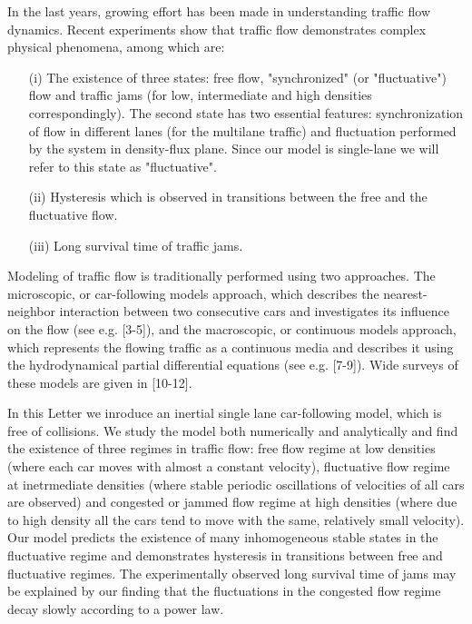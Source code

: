 \pacs{}


In the last years, growing effort has been made in understanding 
traffic flow dynamics. Recent experiments \cite{KR1,KR2} show that
traffic flow demonstrates complex physical phenomena, among which 
are: 
\begin{itemize}
\item[(i)] The existence of three states: free flow, "synchronized" (or
"fluctuative") flow and traffic jams (for low, intermediate and high
densities correspondingly). 
The second state has two essential features: synchronization of flow in
different lanes (for the multilane traffic) and fluctuation performed by the 
system in density-flux plane. Since our model is single-lane we will refer to
this state as "fluctuative".  
\item[(ii)] Hysteresis which is observed in transitions between the free and
the  fluctuative  flow.
\item[(iii)] Long survival time of traffic jams.  
\end{itemize}
Modeling of traffic flow is traditionally performed using two approaches.
The microscopic, or car-following models approach, which describes the nearest-neighbor interaction  
between two consecutive cars and investigates its influence on the 
flow (see e.g. [3-5]), and the macroscopic, or
continuous models approach, which represents the flowing traffic as a 
continuous media and describes it using the hydrodynamical partial
differential equations (see e.g. [7-9]). Wide surveys of
these models are given in [10-12]. 

In this Letter we inroduce an inertial single lane car-following model, which
is free of collisions.  We study the model both numerically and
analytically and find the existence of three regimes in traffic flow:
free flow regime at low densities (where each car moves with almost a constant
velocity), fluctuative flow regime at inetrmediate densities (where stable
periodic oscillations of velocities of all cars are observed) and congested or
jammed flow regime at high densities (where due to high density all the cars
tend to move with the same, relatively small velocity). Our model predicts the
existence of many inhomogeneous stable states in the fluctuative regime and
demonstrates hysteresis in transitions between free and fluctuative 
regimes. The experimentally observed long survival time of jams may be
explained by our finding that the fluctuations in the congested flow regime
decay slowly according to a power law.   


